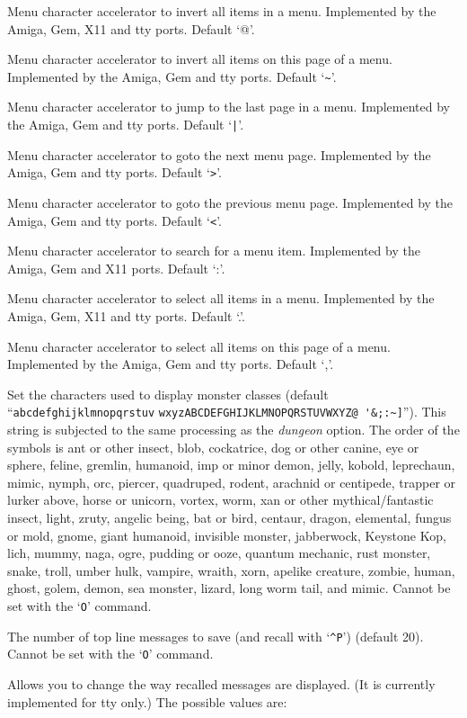 \item[\ib{menu\_invert\_all}]
Menu character accelerator to invert all items in a menu.
Implemented by the Amiga, Gem, X11 and tty ports.
Default `@'.
\item[\ib{menu\_invert\_page}]
Menu character accelerator to invert all items on this page of a menu.
Implemented by the Amiga, Gem and tty ports.
Default `\verb+~+'.
\item[\ib{menu\_last\_page}]
Menu character accelerator to jump to the last page in a menu.
Implemented by the Amiga, Gem and tty ports.
Default `\verb+|+'.
\item[\ib{menu\_next\_page}]
Menu character accelerator to goto the next menu page.
Implemented by the Amiga, Gem and tty ports.
Default `\verb+>+'.
\item[\ib{menu\_previous\_page}]
Menu character accelerator to goto the previous menu page.
Implemented by the Amiga, Gem and tty ports.
Default `\verb+<+'.
\item[\ib{menu\_search}]
Menu character accelerator to search for a menu item.
Implemented by the Amiga, Gem and X11 ports.
Default `:'.
\item[\ib{menu\_select\_all}]
Menu character accelerator to select all items in a menu.
Implemented by the Amiga, Gem, X11 and tty ports.
Default `.'.
\item[\ib{menu\_select\_page}]
Menu character accelerator to select all items on this page of a menu.
Implemented by the Amiga, Gem and tty ports.
Default `,'.
\item[\ib{monsters}]
Set the characters used to display monster classes (default
``\verb+abcdefghijklmnopqrstuv+
\verb+wxyzABCDEFGHIJKLMNOPQRSTUVWXYZ@ '&;:~]+'').
This string is subjected to the same processing as the {\it dungeon\/} option.
The order of the symbols is
ant or other insect, blob, cockatrice,
dog or other canine, eye or sphere, feline,
gremlin, humanoid, imp or minor demon,
jelly, kobold, leprechaun,
mimic, nymph, orc,
piercer, quadruped, rodent,
arachnid or centipede, trapper or lurker above, horse or unicorn,
vortex, worm, xan or other mythical/fantastic insect,
light, zruty,
angelic being, bat or bird, centaur,
dragon, elemental, fungus or mold,
gnome, giant humanoid, invisible monster,
jabberwock, Keystone Kop, lich,
mummy, naga, ogre,
pudding or ooze, quantum mechanic, rust monster,
snake, troll, umber hulk,
vampire, wraith, xorn,
apelike creature, zombie,
human, ghost, golem,
demon, sea monster, lizard,
long worm tail, and mimic.
Cannot be set with the `{\tt O}' command.
\item[\ib{msghistory}]
The number of top line messages to save (and recall with `{\tt \^{}P}')
(default 20). Cannot be set with the `{\tt O}' command.
\item[\ib{msg\_window}]
Allows you to change the way recalled messages are displayed.
(It is currently implemented for tty only.) The possible values are:

